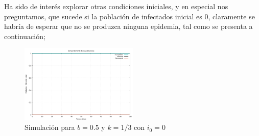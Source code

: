 \documentclass[journal]{IEEEtran}
\begin{document}
Ha sido de interés explorar otras condiciones iniciales, y en especial nos preguntamos, que sucede si la población de infectados
inicial es 0, claramente se habría de esperar que no se produzca ninguna epidemia, tal como se presenta a continuación;
\begin{figure}[H]
	\centering
	\includegraphics[width=0.5\textwidth]{SIR/graph-i0-SIR}
	\caption{Simulación para $b=0.5$ y $k=1/3$ con $i_0=0$}
	\label{simulacion5}
\end{figure}
	
\end{document}
